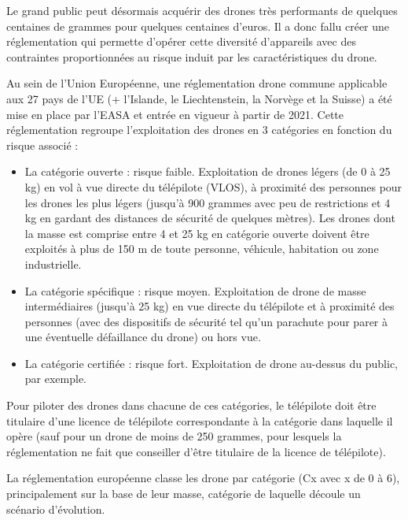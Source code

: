 Le grand public peut désormais acquérir des drones très performants de quelques centaines de grammes pour quelques centaines d'euros. Il a donc fallu créer une réglementation qui permette d'opérer cette diversité d'appareils avec des contraintes proportionnées au risque induit par les caractéristiques du drone.

Au sein de l'Union Européenne, une réglementation drone commune applicable aux 27 pays de l'UE (+ l'Islande, le Liechtenstein, la Norvège et la Suisse) a été mise en place par l'EASA et entrée en vigueur à partir de 2021. Cette réglementation regroupe l'exploitation des drones en 3 catégories en fonction du risque associé :

\begin{itemize}
	\item La catégorie ouverte : risque faible. Exploitation de drones légers (de 0 à 25 kg) en vol à vue directe du télépilote (VLOS), à proximité des personnes pour les drones les plus légers (jusqu'à 900 grammes avec peu de restrictions et 4 kg en gardant des distances de sécurité de quelques mètres). Les drones dont la masse est comprise entre 4 et 25 kg en catégorie ouverte doivent être exploités à plus de 150 m de toute personne, véhicule, habitation ou zone industrielle.
	\item La catégorie spécifique : risque moyen. Exploitation de drone de masse intermédiaires (jusqu'à 25 kg) en vue directe du télépilote et à proximité des personnes (avec des dispositifs de sécurité tel qu'un parachute pour parer à une éventuelle défaillance du drone) ou hors vue.
	\item La catégorie certifiée : risque fort. Exploitation de drone au-dessus du public, par exemple.
\end{itemize}

Pour piloter des drones dans chacune de ces catégories, le télépilote doit être titulaire d'une licence de télépilote correspondante à la catégorie dans laquelle il opère (sauf pour un drone de moins de 250 grammes, pour lesquels la réglementation ne fait que conseiller d'être titulaire de la licence de télépilote).

La réglementation européenne classe les drone par catégorie (Cx avec x de 0 à 6), principalement sur la base de leur masse, catégorie de laquelle découle un scénario d'évolution.

